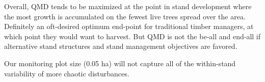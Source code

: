 \documentclass[
]{article}
\begin{document}
Overall, QMD tends to be maximized at the point in stand development where the most growth is accumulated on the fewest live trees spread over the area. Definitely an oft-desired optimum end-point for traditional timber managers, at which point they would want to harvest. But QMD is not the be-all and end-all if alternative stand structures and stand management objectives are favored.

Our monitoring plot size (0.05 ha) will not capture all of the within-stand variability of more chaotic disturbances.
\end{document}
